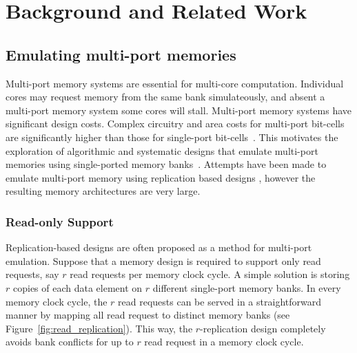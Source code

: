 \section{Background and Related Work}
\label{sec:bg}

\subsection{Emulating multi-port memories}
\label{sec:emulation}

Multi-port memory systems are essential for multi-core computation. Individual cores may request memory from the same bank simulateously, and absent a multi-port memory system some cores will stall. Multi-port memory systems have significant design costs. Complex circuitry and area costs for multi-port bit-cells are significantly higher than those for single-port bit-cells~\cite{Suzuki,WLCH14}. This motivates the exploration of algorithmic and systematic designs that emulate multi-port memories using single-ported memory banks~\cite{ACP88, EMY91, RG91,Memoir_xor, Memoir_xor_virtual}. Attempts have been made to emulate multi-port memory using replication based designs \cite{CCES93}, however the resulting memory architectures are very large. 


\subsubsection{Read-only Support} 
\label{sec:read_only}
Replication-based designs are often proposed as a method for multi-port emulation. Suppose that a memory design is required to support only read requests, say $r$ read requests per memory clock cycle. A simple solution is storing $r$ copies of each data element on $r$ different single-port memory banks. In every memory clock cycle, the $r$ read requests can be served in a straightforward manner by mapping all read request to distinct memory banks (see Figure~\ref{fig:read_replication}). This way, the $r$-replication design completely avoids bank conflicts for up to $r$ read request in a memory clock cycle. 

